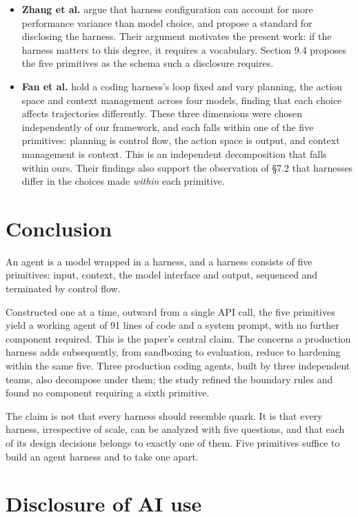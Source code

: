 \begin{itemize}
\tightlist
\item
  \textbf{Zhang et al.} \cite{zhang2026stop} argue that harness configuration can account for more performance variance than model choice, and propose a standard for disclosing the harness. Their argument motivates the present work: if the harness matters to this degree, it requires a vocabulary. Section 9.4 proposes the five primitives as the schema such a disclosure requires.
\item
  \textbf{Fan et al.} \cite{fan2026empirical} hold a coding harness's loop fixed and vary planning, the action space and context management across four models, finding that each choice affects trajectories differently. These three dimensions were chosen independently of our framework, and each falls within one of the five primitives: planning is control flow, the action space is output, and context management is context. This is an independent decomposition that falls within ours. Their findings also support the observation of §7.2 that harnesses differ in the choices made \emph{within} each primitive.
\end{itemize}

\section{Conclusion}

An agent is a model wrapped in a harness, and a harness consists of five primitives: input, context, the model interface and output, sequenced and terminated by control flow.

Constructed one at a time, outward from a single API call, the five primitives yield a working agent of 91 lines of code and a system prompt, with no further component required. This is the paper's central claim. The concerns a production harness adds subsequently, from sandboxing to evaluation, reduce to hardening within the same five. Three production coding agents, built by three independent teams, also decompose under them; the study refined the boundary rules and found no component requiring a sixth primitive.

The claim is not that every harness should resemble quark. It is that every harness, irrespective of scale, can be analyzed with five questions, and that each of its design decisions belongs to exactly one of them. Five primitives suffice to build an agent harness and to take one apart.

\section*{Disclosure of AI use}

